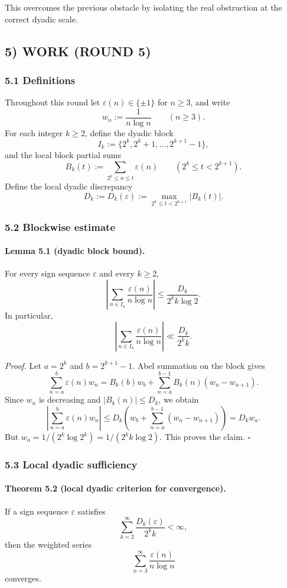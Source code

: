 This overcomes the previous obstacle by isolating the real obstruction at the correct dyadic scale.

\subsection{5) WORK (ROUND 5)}

\subsubsection{5.1 Definitions}

Throughout this round let \(\varepsilon(n)\in\{\pm 1\}\) for \(n\ge 3\), and write
\[
w_n:=\frac{1}{n\log n} \qquad (n\ge 3).
\]
For each integer \(k\ge 2\), define the dyadic block
\[
I_k := \{2^k,2^k+1,\dots,2^{k+1}-1\},
\]
and the local block partial sums
\[
B_k(t):=\sum_{2^k\le n\le t}\varepsilon(n)
\qquad (2^k\le t<2^{k+1}).
\]
Define the local dyadic discrepancy
\[
D_k:=D_k(\varepsilon):=\max_{2^k\le t<2^{k+1}} |B_k(t)|.
\]

\subsubsection{5.2 Blockwise estimate}

\paragraph{Lemma 5.1 (dyadic block bound).}
For every sign sequence \(\varepsilon\) and every \(k\ge 2\),
\[
\left|\sum_{n\in I_k}\frac{\varepsilon(n)}{n\log n}\right|
\le \frac{D_k}{2^k k\log 2}.
\]
In particular,
\[
\left|\sum_{n\in I_k}\frac{\varepsilon(n)}{n\log n}\right| \ll \frac{D_k}{2^k k}.
\]

\emph{Proof.}
Let \(a=2^k\) and \(b=2^{k+1}-1\).  Abel summation on the block gives
\[
\sum_{n=a}^{b}\varepsilon(n)w_n
= B_k(b)w_b + \sum_{n=a}^{b-1} B_k(n)(w_n-w_{n+1}).
\]
Since \(w_n\) is decreasing and \(|B_k(n)|\le D_k\), we obtain
\[
\left|\sum_{n=a}^{b}\varepsilon(n)w_n\right|
\le D_k\left(w_b+\sum_{n=a}^{b-1}(w_n-w_{n+1})\right)
= D_k w_a.
\]
But \(w_a=1/(2^k\log 2^k)=1/(2^k k\log 2)\).  This proves the claim.
\hfill$\square$

\subsubsection{5.3 Local dyadic sufficiency}

\paragraph{Theorem 5.2 (local dyadic criterion for convergence).}
If a sign sequence \(\varepsilon\) satisfies
\[
\sum_{k=2}^{\infty}\frac{D_k(\varepsilon)}{2^k k}<\infty,
\]
then the weighted series
\[
\sum_{n=3}^{\infty}\frac{\varepsilon(n)}{n\log n}
\]
converges.

